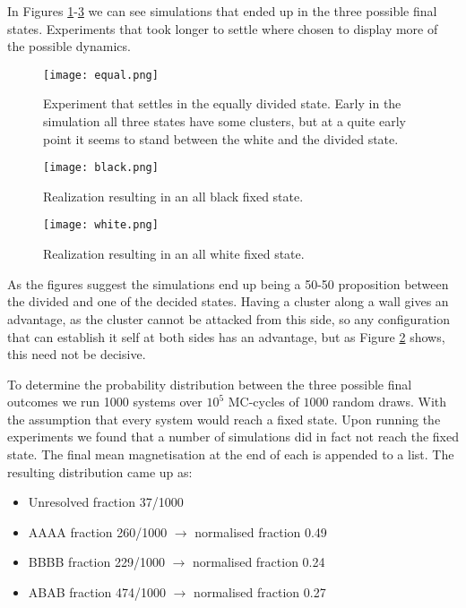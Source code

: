 \documentclass[a4paper]{article}
\begin{document}
In Figures \ref{fig:equal}-\ref{fig:white} we can see simulations that ended up in the three possible final states. Experiments that took longer to settle where chosen to display more of the possible dynamics.


\begin{figure}[H]
 \centerline{\texttt{[image: equal.png]}}
 \caption{Experiment that settles in the equally divided state. Early in the simulation all three states have some clusters, but at a quite early point it seems to stand between the white and the divided state.}
 \label{fig:equal}
\end{figure}

\begin{figure}[H]
 \centerline{\texttt{[image: black.png]}}
 \caption{Realization resulting in an all black fixed state.}
 \label{fig:black}
\end{figure}

\begin{figure}[H]
 \centerline{\texttt{[image: white.png]}}
 \caption{Realization resulting in an all white fixed state.}
 \label{fig:white}
\end{figure}

As the figures suggest the simulations end up being a 50-50 proposition between the divided and one of the decided states. Having a cluster along a wall gives an advantage, as the cluster cannot be attacked from this side, so any configuration that can establish it self at both sides has an advantage, but as Figure \ref{fig:black} shows, this need not be decisive. 


To determine the probability distribution between the three possible final outcomes we run 1000 systems over $10^5$ MC-cycles of $1000$ random draws. With the assumption that every system would reach a fixed state. Upon running the experiments we found that a number of simulations did in fact not reach the fixed state. The final mean magnetisation at the end of each is appended to a list. The resulting distribution came up as: 
\begin{itemize}
    \item Unresolved fraction 37/1000
    \item AAAA fraction 260/1000 $\rightarrow$ normalised fraction 0.49
    \item BBBB fraction 229/1000 $\rightarrow$ normalised fraction 0.24
    \item ABAB fraction 474/1000 $\rightarrow$ normalised fraction 0.27
\end{itemize}
\end{document}
